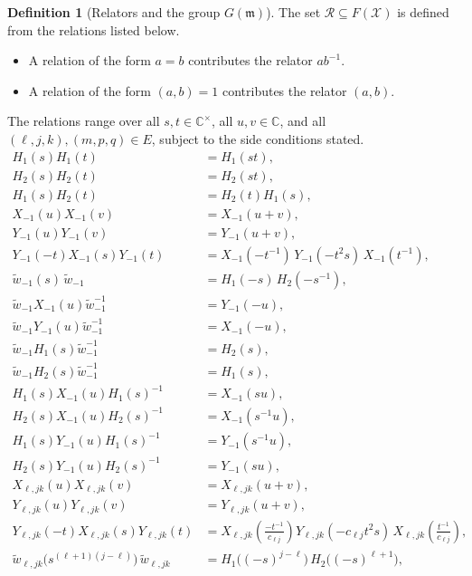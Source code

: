 \documentclass[11pt]{article}
\theoremstyle{definition}
\newtheorem{definition}[theorem]{Definition}
\theoremstyle{remark}
\newcommand{\wt}{\widetilde{w}}
\newcommand{\CC}{\mathbb{C}}
\begin{document}
\begin{definition}[Relators and the group $G(\mathfrak{m})$]
The set $\mathcal{R}\subseteq F(\mathcal{X})$ is defined from the relations listed below.
\begin{itemize}
\item A relation of the form $a=b$ contributes the relator $ab^{-1}$.
\item A relation of the form $(a,b)=1$ contributes the relator $(a,b)$.
\end{itemize}
The relations range over all $s,t\in\CC^\times$, all $u,v\in\CC$, and all $(\ell,j,k),(m,p,q)\in E$, subject to the side conditions stated.
\allowdisplaybreaks
\begin{align*}
H_1(s)H_1(t)&=H_1(st), \tag{H:1a}\\
H_2(s)H_2(t)&=H_2(st), \tag{H:1b}\\
H_1(s)H_2(t)&=H_2(t)H_1(s), \tag{H:2}\\
X_{-1}(u)X_{-1}(v)&=X_{-1}(u+v), \tag{Re:1a}\\
Y_{-1}(u)Y_{-1}(v)&=Y_{-1}(u+v), \tag{Re:1b}\\
Y_{-1}(-t)X_{-1}(s)Y_{-1}(t)&=X_{-1}(-t^{-1})\,Y_{-1}(-t^2s)\,X_{-1}(t^{-1}), \tag{Re:2}\\
\wt_{-1}(s)\,\wt_{-1}&=H_1(-s)\,H_2(-s^{-1}), \tag{Re:3}\\
\wt_{-1}X_{-1}(u)\wt_{-1}^{-1}&=Y_{-1}(-u), \tag{Re:4a}\\
\wt_{-1}Y_{-1}(u)\wt_{-1}^{-1}&=X_{-1}(-u), \tag{Re:4b}\\
\wt_{-1}H_1(s)\wt_{-1}^{-1}&=H_2(s), \tag{Re:5a}\\
\wt_{-1}H_2(s)\wt_{-1}^{-1}&=H_1(s), \tag{Re:5b}\\
H_1(s)X_{-1}(u)H_1(s)^{-1}&=X_{-1}(su), \tag{Re:6a}\\
H_2(s)X_{-1}(u)H_2(s)^{-1}&=X_{-1}(s^{-1}u), \tag{Re:6b}\\
H_1(s)Y_{-1}(u)H_1(s)^{-1}&=Y_{-1}(s^{-1}u), \tag{Re:6c}\\
H_2(s)Y_{-1}(u)H_2(s)^{-1}&=Y_{-1}(su), \tag{Re:6d}\\
X_{\ell,jk}(u)X_{\ell,jk}(v)&=X_{\ell,jk}(u+v), \tag{Im:1a}\\
Y_{\ell,jk}(u)Y_{\ell,jk}(v)&=Y_{\ell,jk}(u+v), \tag{Im:1b}\\
Y_{\ell,jk}(-t)X_{\ell,jk}(s)Y_{\ell,jk}(t)&=X_{\ell,jk}\!\left(\frac{-t^{-1}}{c_{\ell j}}\right)Y_{\ell,jk}(-c_{\ell j}t^2s)\,X_{\ell,jk}\!\left(\frac{t^{-1}}{c_{\ell j}}\right), \tag{Im:2}\\
\wt_{\ell,jk}\big(s^{(\ell+1)(j-\ell)}\big)\,\wt_{\ell,jk}&=H_1\big((-s)^{j-\ell}\big)\,H_2\big((-s)^{\ell+1}\big), \tag{Im:3}\\

\end{align*}
\end{definition}
\end{document}
